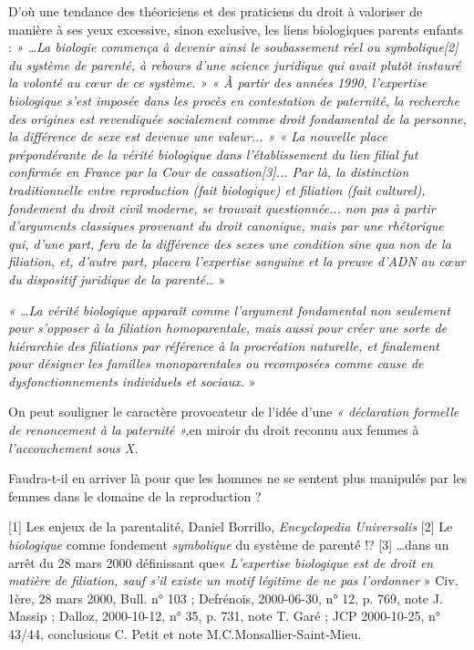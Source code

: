  D'où une tendance des théoriciens et des praticiens du droit à valoriser de manière à ses yeux excessive, sinon exclusive, les liens biologiques parents enfants : \emph{ » …La biologie commença à devenir ainsi le soubassement réel ou symbolique[2] du système de parenté, à rebours d'une science juridique qui avait plutôt instauré la volonté au cœur de ce système. » « À partir des années 1990, l'expertise biologique s'est imposée dans les procès en contestation de paternité, la recherche des origines est revendiquée socialement comme droit fondamental de la personne, la différence de sexe est devenue une valeur... » « La nouvelle place prépondérante de la vérité biologique dans l'établissement du lien filial fut confirmée en France par la Cour de cassation[3]... Par là, la distinction traditionnelle entre reproduction (fait biologique) et filiation (fait culturel), fondement du droit civil moderne, se trouvait questionnée... non pas à partir d'arguments classiques provenant du droit canonique, mais par une rhétorique qui, d'une part, fera de la différence des sexes une condition sine qua non de la filiation, et, d'autre part, placera l'expertise sanguine et la preuve d'ADN au cœur du dispositif juridique de la parenté…} » 
 
 \emph{« …La vérité biologique apparaît comme l'argument fondamental non seulement pour s'opposer à la filiation homoparentale, mais aussi pour créer une sorte de hiérarchie des filiations par référence à la procréation naturelle, et finalement pour désigner les familles monoparentales ou recomposées comme cause de dysfonctionnements individuels et sociaux.} »
 
 On peut souligner le caractère provocateur de l'idée d'une\emph{ « déclaration formelle de renoncement à la paternité »,}en miroir du droit reconnu aux femmes à \emph{l'accouchement sous X.}
 
 Faudra-t-il en arriver là pour que les hommes ne se sentent plus manipulés par les femmes dans le domaine de la reproduction ?
 
[1] Les enjeux de la parentalité, Daniel Borrillo, \emph{Encyclopedia Universalis}
[2] Le \emph{biologique} comme fondement \emph{symbolique} du système de parenté !?
[3] …dans un arrêt du 28 mars 2000 définissant que\emph{}« \emph{L'expertise biologique est de droit en matière de filiation, sauf s'il existe un motif légitime de ne pas l'ordonner} » Civ. 1ère, 28 mars 2000, Bull. n° 103 ; Defrénois, 2000-06-30, n° 12, p. 769, note J. Massip ; Dalloz, 2000-10-12, n° 35, p. 731, note T. Garé ; JCP 2000-10-25, n° 43/44, conclusions C. Petit et note M.C.Monsallier-Saint-Mieu.
